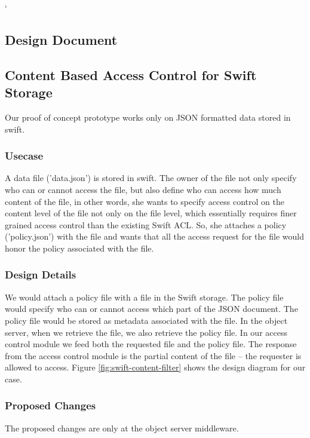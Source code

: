 \newpage
`
\newpage
\begin{appendices}
\section{Design Document} \label{App:design-document}

\subsection{  Content Based Access Control for Swift Storage }
Our proof of concept prototype works only on JSON formatted data stored in swift.

\subsubsection{ Usecase}
A data file ('data.json') is stored in swift. The owner of the file not only  specify who can or cannot access the file, but also define who can access how much content of the file, in other words,  she wants to specify access control on the content level of the file not only on the file level,  which essentially requires  finer grained access control than the existing Swift ACL. So, she  attaches a  policy ('policy.json')  with the file and wants that all the access request for the file would honor the policy associated with the file.

\subsubsection{Design Details}
We would attach a policy file with a file in the Swift storage. The policy file would specify who can or cannot access which part of the JSON document. The policy file would be stored as metadata associated with the file. In the object server, when we retrieve the file, we also retrieve the policy file. In our access control module we feed both the requested file and the policy file. The response from the access control module is the partial content of the file – the requester is allowed to access. Figure \ref{fig:swift-content-filter} shows the design diagram for our case.

\subsubsection{Proposed Changes}
The proposed changes are only at the object server middleware.

\begin{itemize}


\end{itemize}
\end{appendices}

